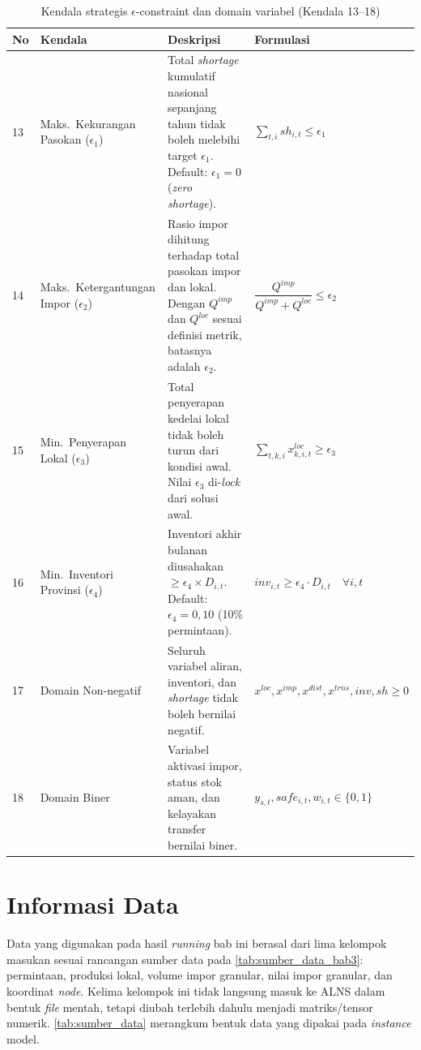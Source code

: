 \documentclass{file/TA-ITS}
\theoremstyle{definition}
\theoremstyle{definition}
\theoremstyle{plain}
\begin{document}
\begin{table}[H]
\centering
\caption{Kendala strategis \(\epsilon\)-constraint dan domain variabel (Kendala 13--18)}
\label{tab:kendala_strategis_domain}
\scriptsize
\renewcommand{\arraystretch}{1.5}
\begin{tabularx}{\textwidth}{@{}p{}p{}p{}X@{}}
\toprule
\textbf{No} & \textbf{Kendala} & \textbf{Deskripsi} & \textbf{Formulasi} \\
\midrule
13 & Maks.\ Kekurangan Pasokan ($\epsilon_1$) & Total \textit{shortage} kumulatif nasional sepanjang tahun tidak boleh melebihi target $\epsilon_1$. Default: $\epsilon_1 = 0$ (\textit{zero shortage}). & $\sum_{t,i} sh_{i,t} \leq \epsilon_1$ \\
14 & Maks.\ Ketergantungan Impor ($\epsilon_2$) & Rasio impor dihitung terhadap total pasokan impor dan lokal. Dengan \(Q^{imp}\) dan \(Q^{loc}\) sesuai definisi metrik, batasnya adalah $\epsilon_2$. & $\dfrac{Q^{imp}}{Q^{imp}+Q^{loc}} \leq \epsilon_2$ \\
15 & Min.\ Penyerapan Lokal ($\epsilon_3$) & Total penyerapan kedelai lokal tidak boleh turun dari kondisi awal. Nilai $\epsilon_3$ di-\textit{lock} dari solusi awal. & $\sum_{t,k,i} x^{loc}_{k,i,t} \geq \epsilon_3$ \\
16 & Min.\ Inventori Provinsi ($\epsilon_4$) & Inventori akhir bulanan diusahakan $\geq \epsilon_4 \times D_{i,t}$. Default: $\epsilon_4 = 0{,}10$ (10\% permintaan). & $inv_{i,t} \geq \epsilon_4 \cdot D_{i,t} \quad \forall i,t$ \\
17 & Domain Non-negatif & Seluruh variabel aliran, inventori, dan \textit{shortage} tidak boleh bernilai negatif. & $x^{loc},x^{imp},x^{dist},x^{trns},inv,sh \geq 0$ \\
18 & Domain Biner & Variabel aktivasi impor, status stok aman, dan kelayakan transfer bernilai biner. & $y_{s,t},safe_{i,t},w_{i,t} \in \{0,1\}$ \\
\bottomrule
\end{tabularx}
\renewcommand{\arraystretch}{1}
\end{table}

\section{Informasi Data}

Data yang digunakan pada hasil \textit{running} bab ini berasal dari lima kelompok masukan sesuai rancangan sumber data pada \ref{tab:sumber_data_bab3}: permintaan, produksi lokal, volume impor granular, nilai impor granular, dan koordinat \textit{node}. Kelima kelompok ini tidak langsung masuk ke ALNS dalam bentuk \textit{file} mentah, tetapi diubah terlebih dahulu menjadi matriks/tensor numerik. \ref{tab:sumber_data} merangkum bentuk data yang dipakai pada \textit{instance} model.
\end{document}
